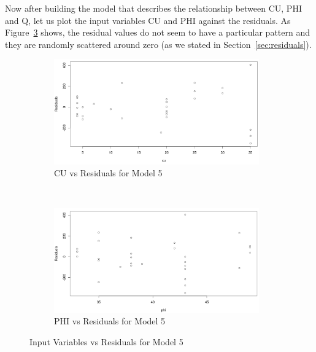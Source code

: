 \documentclass[a4paper,12pt, english]{article}
\begin{document}
Now after building the model that describes the relationship between CU, PHI and Q, let us plot the input variables CU and PHI against the residuals. As Figure~\ref{fig:mod5-resids} shows, the residual values do not seem to have a particular pattern and they are randomly scattered around zero (as we stated in Section~\ref{sec:residuals}).

\begin{figure}[H]
        \centering
        \begin{subfigure}[b]{0.85\textwidth}
                \includegraphics[width=0.96986\textwidth]{mod5-resid1}
  		\caption{CU vs Residuals for Model 5}
  		\label{fig:mod5-resid1}
        \end{subfigure}%
        ~ %
        
        \begin{subfigure}[b]{0.85\textwidth}
                \includegraphics[width=0.96986\textwidth]{mod5-resid2}
 		 \caption{PHI vs Residuals for Model 5}
 		 \label{fig:mod5-resid2}
        \end{subfigure}
        
        \caption{Input Variables vs Residuals for Model 5}
        \label{fig:mod5-resids}
\end{figure}
\end{document}
